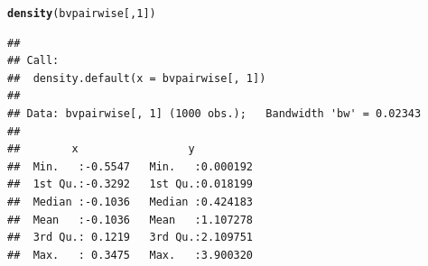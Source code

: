 \documentclass{article}\usepackage[]{graphicx}\usepackage[]{color}
\makeatletter
\newcommand{\hlnum}[1]{\textcolor[rgb]{0.686,0.059,0.569}{#1}}%
\newcommand{\hlstd}[1]{\textcolor[rgb]{0.345,0.345,0.345}{#1}}%
\newcommand{\hlkwd}[1]{\textcolor[rgb]{0.737,0.353,0.396}{\textbf{#1}}}%
\newenvironment{kframe}{%
 \def\at@end@of@kframe{}%
 \ifinner\ifhmode%
  \def\at@end@of@kframe{\end{minipage}}%
  \begin{minipage}{\columnwidth}%
 \fi\fi%
 \def\FrameCommand##1{\hskip\@totalleftmargin \hskip-\fboxsep
 \colorbox{shadecolor}{##1}\hskip-\fboxsep
     \hskip-\linewidth \hskip-\@totalleftmargin \hskip\columnwidth}%
 \MakeFramed {\advance\hsize-\width
   \@totalleftmargin\z@ \linewidth\hsize
   \@setminipage}}%
 {\par\unskip\endMakeFramed%
 \at@end@of@kframe}
\newenvironment{knitrout}{}{} %
\makeatother
\begin{document}
\begin{knitrout}
\begin{kframe}\begin{alltt}
\hlkwd{density}\hlstd{(bvpairwise[,}\hlnum{1}\hlstd{])}
\end{alltt}
\begin{verbatim}
## 
## Call:
## 	density.default(x = bvpairwise[, 1])
## 
## Data: bvpairwise[, 1] (1000 obs.);	Bandwidth 'bw' = 0.02343
## 
##        x                 y           
##  Min.   :-0.5547   Min.   :0.000192  
##  1st Qu.:-0.3292   1st Qu.:0.018199  
##  Median :-0.1036   Median :0.424183  
##  Mean   :-0.1036   Mean   :1.107278  
##  3rd Qu.: 0.1219   3rd Qu.:2.109751  
##  Max.   : 0.3475   Max.   :3.900320
\end{verbatim}
\end{kframe}
\end{knitrout}
\end{document}
